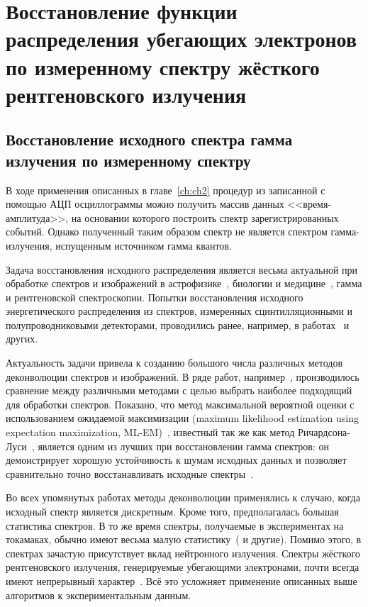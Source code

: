 \chapter{Восстановление функции распределения убегающих электронов по измеренному спектру жёсткого рентгеновского излучения}
\label{ch:ch3}


\section{Восстановление исходного спектра гамма излучения по измеренному спектру}

В ходе применения описанных в главе~\ref{ch:ch2} процедур из записанной с помощью АЦП осциллограммы можно получить массив данных <<время-амплитуда>>, на основании которого построить спектр зарегистрированных событий. Однако полученный таким образом спектр не является спектром гамма-излучения, испущенным источником гамма квантов. 

Задача восстановления исходного распределения является весьма актуальной при обработке спектров и изображений в астрофизике~\cite{JungRichardt2016}, биологии и медицине~\cite{Vardi1985}, гамма и рентгеновской спектроскопии. Попытки восстановления исходного энергетического распределения из спектров, измеренных сцинтилляционными и полупроводниковыми детекторами, проводились ранее, например, в работах~\cite{Raad2008,Meng2000} и других.

Актуальность задачи привела к созданию большого числа различных методов деконволюции спектров и изображений. В ряде работ, например~\cite{Meng2000,Lanteri1999,Morhac2011,Jeffrey1986,Bouchet1995}, производилось сравнение между различными методами с целью выбрать наиболее подходящий для обработки спектров. Показано, что метод максимальной вероятной оценки с использованием ожидаемой максимизации (maximum likelihood estimation using expectation maximization, ML-EM)~\cite{Vardi1985}, известный так же как метод Ричардсона-Луси~\cite{Richardson1972,Lucy1974}, является одним из лучших при восстановлении гамма спектров: он демонстрирует хорошую устойчивость к шумам исходных данных и позволяет сравнительно точно восстанавливать исходные спектры~\cite{Meng2000,Morhac2011}.

Во всех упомянутых работах методы деконволюции применялись к случаю, когда исходный спектр является дискретным. Кроме того, предполагалась большая статистика спектров. В то же время спектры, получаемые в экспериментах на токамаках, обычно имеют весьма малую статистику~(\cite{Khilkevitch2013,Shevelev2018,Reux2022,Chugunov2011,Shevelev2013} и другие). Помимо этого, в спектрах зачастую присутствует вклад нейтронного излучения. Спектры жёсткого рентгеновского излучения, генерируемые убегающими электронами, почти всегда имеют непрерывный характер~\cite{Shevelev2013}. Всё это усложняет применение описанных выше алгоритмов к экспериментальным данным.~\cite{Khilkevitch2013} 

